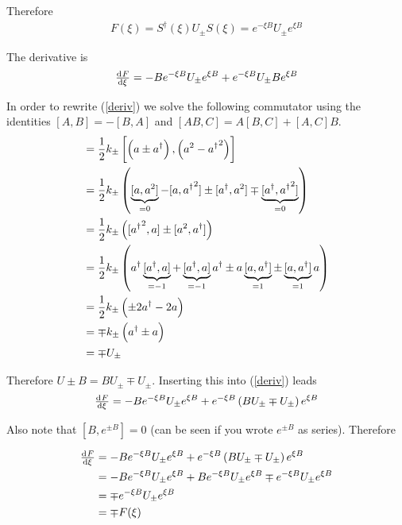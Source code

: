 \documentclass[a4paper,german,12pt,smallheadings]{scrartcl}
\begin{document}
\begin{enumerate}[a)]
    Therefore
    \begin{align*}
      F(\xi) = S^\dagger(\xi) U_\pm S(\xi) = e^{-\xi B} U_\pm e^{\xi B}
    \end{align*}

    The derivative is
    \begin{equation}
      \od{F}{\xi} = -Be^{-\xi B}U_\pm e^{\xi B} + e^{-\xi B}U_\pm B e^{\xi B}
      \label{deriv}
    \end{equation}

    In order to rewrite (\ref{deriv}) we solve the following commutator using
    the identities $[A,B] = -[B,A]$ and $[AB,C] = A[B,C] + [A,C]B$.
    \begin{align*}
      [U_\pm,B] &= \frac{1}{2} k_\pm \left[\del{a \pm a^\dagger}, \del{a^2 - {a^\dagger}^2}\right] \\
            &= \frac{1}{2} k_\pm \del{\underbrace{[a,a^2]}_{=0} - [a,{a^\dagger}^2] \pm [a^\dagger, a^2] \mp \underbrace{[a^\dagger, {a^\dagger}^2]}_{=0}} \\
            &= \frac{1}{2} k_\pm \del{[{a^\dagger}^2, a] \pm [a^2, a^\dagger]} \\
            &= \frac{1}{2} k_\pm \del{a^\dagger \underbrace{[a^\dagger,a] }_{=-1}+ \underbrace{[a^\dagger, a]}_{=-1}a^\dagger \pm a\underbrace{[a,a^\dagger]}_{=1} \pm \underbrace{[a,a^\dagger]}_{=1}a} \\
            &= \frac{1}{2} k_\pm \del{\pm2a^\dagger -2a} \\
            &= \mp k_\pm \del{a^\dagger \pm a} \\
            &= \mp U_\pm
    \end{align*}

    Therefore $U\pm B = BU_\pm \mp U_\pm$. Inserting this into (\ref{deriv}) leads
    \begin{equation}
      \od{F}{\xi} = -Be^{-\xi B}U_\pm e^{\xi B} + e^{-\xi B} \del{B U_\pm \mp U_\pm} e^{\xi B}
    \end{equation}

    Also note that $[B,e^{\pm B}] = 0$ (can be seen if you wrote $e^{\pm B}$ as series). Therefore

    \begin{align*}
      \od{F}{\xi} &= -B e^{-\xi B}U_\pm e^{\xi B} + e^{-\xi B} \del{BU_\pm \mp U_\pm} e^{\xi B} \\
                  &= -B e^{-\xi B}U_\pm e^{\xi B} + B e^{-\xi B} U_\pm e^{\xi B} \mp e^{-\xi B}U_\pm e^{\xi B} \\
                  &= \mp e^{-\xi B}U_\pm e^{\xi B} \\
                  &= \mp F(\xi)
    \end{align*}


\end{enumerate}
\end{document}
